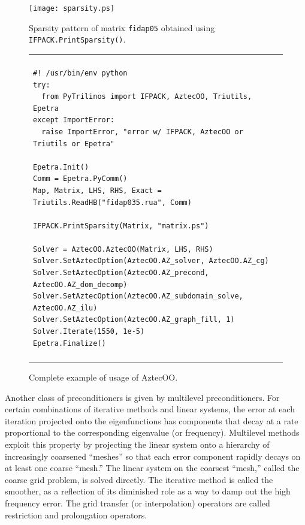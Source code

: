 \documentclass[acmtocl]{acmtrans2m}
\begin{document}
\begin{figure}
\begin{center}
\texttt{[image: sparsity.ps]}
\caption{Sparsity pattern of matrix {\tt fidap05} obtained using {\tt
  IFPACK.PrintSparsity()}.}
\label{fig:sparsity}
\end{center}
\end{figure}

\begin{figure}
\begin{center}
\begin{tabular}{| p{12cm} |}
\hline
\\
\footnotesize
\begin{minipage}{11.5cm}
\begin{verbatim}
#! /usr/bin/env python
try:
  from PyTrilinos import IFPACK, AztecOO, Triutils, Epetra
except ImportError:
  raise ImportError, "error w/ IFPACK, AztecOO or Triutils or Epetra"

Epetra.Init()
Comm = Epetra.PyComm()
Map, Matrix, LHS, RHS, Exact = Triutils.ReadHB("fidap035.rua", Comm)

IFPACK.PrintSparsity(Matrix, "matrix.ps")

Solver = AztecOO.AztecOO(Matrix, LHS, RHS)
Solver.SetAztecOption(AztecOO.AZ_solver, AztecOO.AZ_cg)
Solver.SetAztecOption(AztecOO.AZ_precond, AztecOO.AZ_dom_decomp)
Solver.SetAztecOption(AztecOO.AZ_subdomain_solve, AztecOO.AZ_ilu)
Solver.SetAztecOption(AztecOO.AZ_graph_fill, 1)
Solver.Iterate(1550, 1e-5)
Epetra.Finalize()
\end{verbatim}
\end{minipage}
\\
\\
\hline
\end{tabular}
\caption{Complete example of usage of AztecOO.}
\label{fig:aztecoo}
\end{center}
\end{figure}

\medskip

Another class of preconditioners is given by multilevel
preconditioners.
For certain combinations of iterative methods and
linear systems, the error at each iteration projected onto the
eigenfunctions has components that decay at a rate proportional to the
corresponding eigenvalue (or frequency).  Multilevel methods exploit
this property \cite{Briggs} by projecting the linear system onto a
hierarchy of increasingly coarsened ``meshes'' so that each error
component rapidly decays on at least one coarse ``mesh.''  The linear
system on the coarsest ``mesh,'' called the coarse grid problem, is
solved directly.  The iterative method is called the smoother, as a
reflection of its diminished role as a way to damp out the high
frequency error.  The grid transfer (or interpolation) operators are
called restriction and prolongation
operators.
\end{document}
